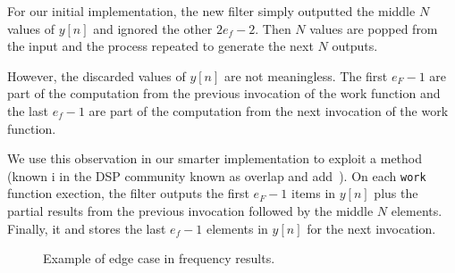 For our initial implementation, the new filter simply outputted the middle $N$ values of
$y[n]$ and ignored the other $2e_f-2$. Then $N$ values are popped from the input and 
the process repeated to generate the next $N$ outputs.

However, the discarded values of $y[n]$ are not meaningless. The first $e_F-1$ are part of the 
computation from the previous invocation of the work function and the last $e_f-1$ are part
of the computation from the next invocation of the work function. 

We use this observation in our smarter implementation to exploit a method (known i
in the DSP community known as overlap and add~\cite{???}). On each {\tt work} function exection, 
the filter outputs the first $e_F-1$ items in $y[n]$ plus the partial results from 
the previous invocation followed by the middle $N$ elements. Finally, it 
and stores the last $e_f-1$ elements in $y[n]$ for the next invocation.

\begin{figure}
\center
\epsfxsize=3.0in
\caption{Example of edge case in frequency results.}
\label{fig:frequency-example}
\end{figure}

